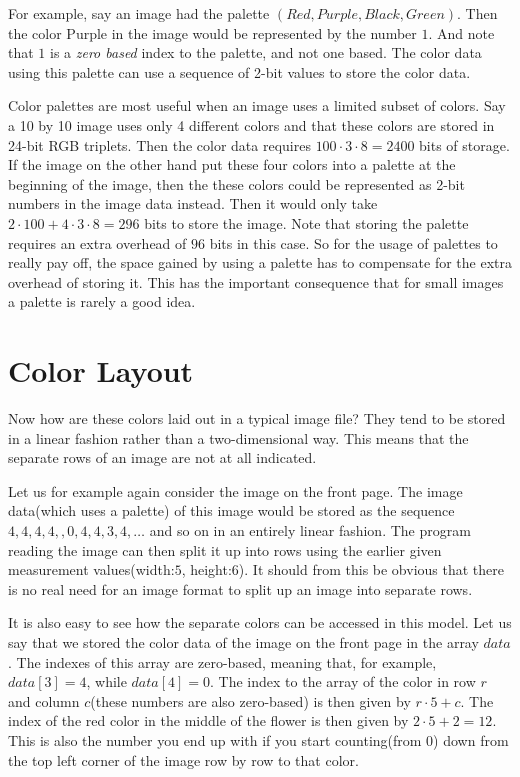 For example, say an image had the palette $(Red, Purple, Black,
Green)$. Then the color Purple in the image would be represented by
the number $1$. And note that $1$ is a \textit{zero based} index to
the palette, and not one based. The color data using this palette can
use a sequence of 2-bit values to store the color data.

Color palettes are most useful when an image uses a limited subset of
colors. Say a 10 by 10 image uses only 4 different colors and that
these colors are stored in 24-bit RGB triplets. Then the color data
requires $100 \cdot 3 \cdot 8 = 2400$ bits of storage. If the image on
the other hand put these four colors into a palette at the beginning
of the image, then the these colors could be represented as 2-bit
numbers in the image data instead. Then it would only take $2 \cdot
100 + 4 \cdot 3 \cdot 8 = 296$ bits to store the image. Note that
storing the palette requires an extra overhead of $96$ bits in this
case. So for the usage of palettes to really pay off, the space gained
by using a palette has to compensate for the extra overhead of storing
it. This has the important consequence that for small images a palette
is rarely a good idea.

\section{Color Layout}
\label{sec:color-layout}

Now how are these colors laid out in a typical image file? They tend
to be stored in a linear fashion rather than a two-dimensional
way. This means that the separate rows of an image are not at all
indicated.

Let us for example again consider the image on the front page. The
image data(which uses a palette) of this image would be stored as the
sequence $4,4,4,4,,0,4,4,3,4,\dots$ and so on in an entirely linear
fashion. The program reading the image can then split it up into rows
using the earlier given measurement values(width:$5$, height:$6$). It
should from this be obvious that there is no real need for an image
format to split up an image into separate rows.

It is also easy to see how the separate colors can be accessed in this
model. Let us say that we stored the color data of the image on the
front page in the array $data$. The indexes of this array are
zero-based, meaning that, for example, $data[3]=4$, while
$data[4]=0$. The index to the array of the color in row $r$ and column
$c$(these numbers are also zero-based) is then given by $r \cdot 5 +
c$. The index of the red color in the middle of the flower is then
given by $2 \cdot 5 + 2 = 12$. This is also the number you end up with
if you start counting(from $0$) down from the top left corner of the
image row by row to that color.

